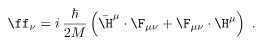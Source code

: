 \begin{equation}
  \label{eq:fop}
  \ff_\nu = i\,\frac{\hbar}{2M}\left(\bar{\H}^\mu\cdot\F_{\mu\nu}+\F_{\mu\nu}\cdot\H^\mu
  \right)\ .
\end{equation}

